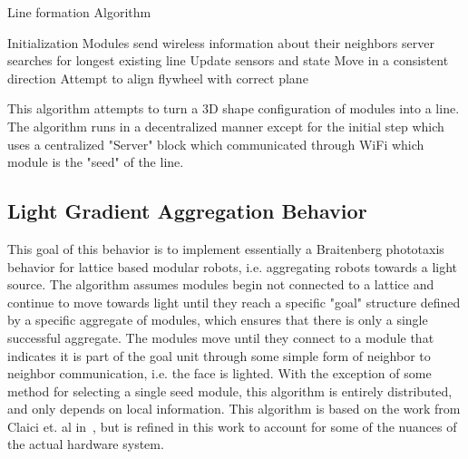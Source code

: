 \setcounter{algorithm}{0}
\begin{algorithm}[ht] 
	\caption{Line formation Algorithm}
	\label{algorithmLine}
	\SetAlgoLined
	Initialization\;
	{
		Modules send wireless information about their neighbors\;
		server searches for longest existing line\;
	}
	{
		Update sensors and state\;
		{
			Move in a consistent direction \;
		}
		{
			Attempt to align flywheel with correct plane\;
		}
	}
	\caption{This algorithm attempts to turn a 3D shape configuration of modules into a line. The algorithm runs in a decentralized manner except for the initial step which uses a centralized "Server" block which communicated through WiFi which module is the "seed" of the line. }
\end{algorithm}




\subsection{Light Gradient Aggregation Behavior}
\label{sec:algLight}
This goal of this behavior is to implement essentially a Braitenberg phototaxis behavior for lattice based modular robots, i.e. aggregating robots towards a light source. The algorithm assumes modules begin not connected to a lattice and continue to move towards light until they reach a specific "goal" structure defined by a specific aggregate of modules, which ensures that there is only a single successful aggregate. The modules move until they connect to a module that indicates it is part of the goal unit through some simple form of neighbor to neighbor communication, i.e. the face is lighted. With the exception of some method for selecting a single seed module, this algorithm is entirely distributed, and only depends on local information. This algorithm is based on the work from Claici et. al in~\cite{claici2017distributed}, but is refined in this work to account for some of the nuances of the actual hardware system.



